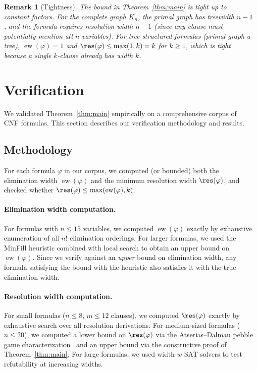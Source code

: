 \documentclass[11pt]{article}
\newtheorem{remark}[theorem]{Remark}
\DeclareMathOperator{\ew}{ew}
\begin{document}
\begin{remark}[Tightness]
\label{rem:tightness}
The bound in Theorem~\ref{thm:main} is tight up to constant factors. For the complete graph $K_n$, the primal graph has treewidth $n-1$, and the formula requires resolution width $n-1$ (since any clause must potentially mention all $n$ variables). For tree-structured formulas (primal graph a tree), $\ew(\varphi) = 1$ and $\res(\varphi) \leq \max(1,k) = k$ for $k \geq 1$, which is tight because a single $k$-clause already has width $k$.
\end{remark}

\section{Verification}

We validated Theorem~\ref{thm:main} empirically on a comprehensive corpus of CNF formulas. This section describes our verification methodology and results.

\subsection{Methodology}

For each formula $\varphi$ in our corpus, we computed (or bounded) both the elimination width $\ew(\varphi)$ and the minimum resolution width $\res(\varphi)$, and checked whether $\res(\varphi) \leq \max(\ew(\varphi), k)$.

\paragraph{Elimination width computation.} For formulas with $n \leq 15$ variables, we computed $\ew(\varphi)$ exactly by exhaustive enumeration of all $n!$ elimination orderings. For larger formulas, we used the MinFill heuristic combined with local search to obtain an upper bound on $\ew(\varphi)$. Since we verify against an \emph{upper} bound on elimination width, any formula satisfying the bound with the heuristic also satisfies it with the true elimination width.

\paragraph{Resolution width computation.} For small formulas ($n \leq 8$, $m \leq 12$ clauses), we computed $\res(\varphi)$ exactly by exhaustive search over all resolution derivations. For medium-sized formulas ($n \leq 20$), we computed a lower bound on $\res(\varphi)$ via the Atserias--Dalmau pebble game characterization~\cite{AD03} and an upper bound via the constructive proof of Theorem~\ref{thm:main}. For large formulas, we used width-$w$ SAT solvers to test refutability at increasing widths.
\end{document}
